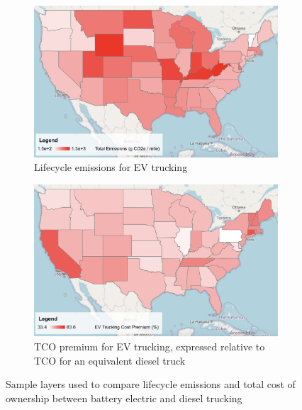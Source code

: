 \begin{figure}[ht]
    \centering
    \begin{subfigure}[b]{0.49\textwidth}
        \centering
        \includegraphics[width=\textwidth]{figures/lifecycle_emissions.png}
        \caption{Lifecycle emissions for EV trucking\newline}
        \label{fig:lifecycle_emissions}
    \end{subfigure}
    \hfill
    \begin{subfigure}[b]{0.49\textwidth}
        \centering
        \includegraphics[width=\textwidth]{figures/ev_cost_premium.png}
        \caption{TCO premium for EV trucking, expressed relative to TCO for an equivalent diesel truck}
        \label{fig:ev_cost_premium}
    \end{subfigure}
    \caption{Sample layers used to compare lifecycle emissions and total cost of ownership between battery electric and diesel trucking}
    \label{fig:truck_costs_emissions}
\end{figure}

